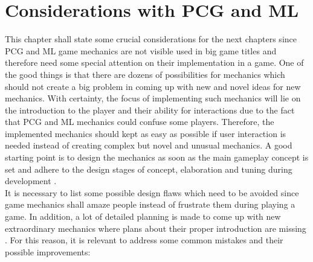 \documentclass[MGS,Master,english]{twbook}%
\begin{document}
\section{Considerations with \acl{PCG} and \acl{ML}}
This chapter shall state some crucial considerations for the next chapters since \ac{PCG} and \ac{ML} game mechanics are not visible used in big game titles and therefore need some special attention on their implementation in a game. One of the good things is that there are dozens of possibilities for mechanics which should not create a big problem in coming up with new and novel ideas for new mechanics. With certainty, the focus of implementing such mechanics will lie on the introduction to the player and their ability for interactions due to the fact that PCG and ML mechanics could confuse some players. Therefore, the implemented mechanics should kept as easy as possible if user interaction is needed instead of creating complex but novel and unusual mechanics. A good starting point is to design the mechanics as soon as the main gameplay concept is set and adhere to the design stages of concept, elaboration and tuning during development \cite{gameDesign::gameMechanicsAdvancedGameDesign}.\\
It is necessary to list some possible design flaws which need to be avoided since game mechanics shall amaze people instead of frustrate them during playing a game. In addition, a lot of detailed planning is made to come up with new extraordinary mechanics where plans about their proper introduction are missing \cite{mechanic::gamasutra::MaxPears}. For this reason, it is relevant to address some common mistakes and their possible improvements:
\end{document}
